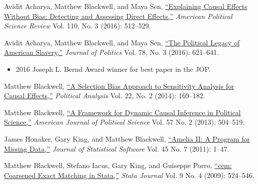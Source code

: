 \documentclass[11pt,article,oneside]{memoir}
\begin{document}
\begin{etaremune}[  itemsep = 1em,
  topsep = 0em,
  partopsep=0in,
  leftmargin=1.5em]
\item Avidit Acharya, Matthew Blackwell, and Maya Sen, \href{http://www.mattblackwell.org/files/papers/direct-effects.pdf}{``Explaining Causal Effects Without Bias: Detecting and Assessing Direct Effects,''} \emph{American Political Science Review } Vol. 110, No. 3 (2016): 512--529.

  
\item Avidit Acharya, Matthew Blackwell, and Maya Sen, \href{http://www.mattblackwell.org/files/papers/slavery.pdf}{``The Political Legacy of American Slavery,''}   \emph{Journal of Politics }Vol. 78, No. 3 (2016): 621--641.
\begin{itemize}[topsep=0em]
\item 2016 Joseph L. Bernd Award winner for best paper in the JOP.
\end{itemize}

\item Matthew Blackwell, \href{https://mattblackwell.org/files/papers/causalsens.pdf}{``A Selection Bias Approach to Sensitivity
    Analysis for Causal Effects,''} \emph{Political Analysis} Vol. 22, No. 2 (2014): 169--182.
  
\item Matthew Blackwell,
\href{http://mattblackwell.org/files/papers/dynci.pdf}{``A Framework
  for Dynamic Causal Inference in Political Science,''}
\emph{American Journal of Political Science} Vol. 57 No. 2 (2013): 504--519.

\item James Honaker, Gary King, and Matthew Blackwell, \href{http://www.mattblackwell.org/files/papers/amelia-jss.pdf}{``Amelia II: A
Program for Missing Data,''} \emph{Journal of Statistical Software}
Vol. 45 No. 7 (2011): 1--47.

\item Matthew Blackwell, Stefano Iacus, Gary King, and Guiseppe Porro, \href{http://www.mattblackwell.org/files/papers/cemStata.pdf}{``cem: Coarsened Exact Matching in Stata,''} \emph{Stata
  Journal} Vol. 9 No. 4 (2009): 524--546. 

\end{etaremune}



\bigskip
\end{document}
